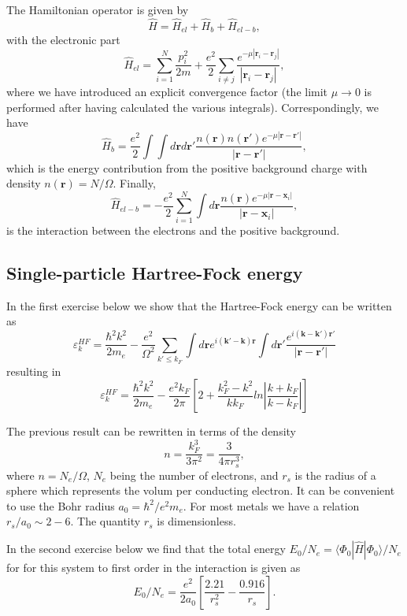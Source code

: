 \documentclass[graybox,sectrefs,envcountresetchap,open=right]{svmonodo}
\begin{document}
The Hamiltonian operator is given by
\[
\hat{H}=\hat{H}_{el}+\hat{H}_{b}+\hat{H}_{el-b},
\]
with the electronic part
\[
\hat{H}_{el}=\sum_{i=1}^N\frac{p_i^2}{2m}+\frac{e^2}{2}\sum_{i\ne j}\frac{e^{-\mu |\mathbf{r}_i-\mathbf{r}_j|}}{|\mathbf{r}_i-\mathbf{r}_j|},
\]
where we have introduced an explicit convergence factor
(the limit $\mu\rightarrow 0$ is performed after having calculated the various integrals).
Correspondingly, we have
\[
\hat{H}_{b}=\frac{e^2}{2}\int\int d\mathbf{r}d\mathbf{r}'\frac{n(\mathbf{r})n(\mathbf{r}')e^{-\mu |\mathbf{r}-\mathbf{r}'|}}{|\mathbf{r}-\mathbf{r}'|},
\]
which is the energy contribution from the positive background charge with density
$n(\mathbf{r})=N/\Omega$. Finally,
\[
\hat{H}_{el-b}=-\frac{e^2}{2}\sum_{i=1}^N\int d\mathbf{r}\frac{n(\mathbf{r})e^{-\mu |\mathbf{r}-\mathbf{x}_i|}}{|\mathbf{r}-\mathbf{x}_i|},
\]
is the interaction between the electrons and the positive background.



\subsection{Single-particle Hartree-Fock energy}

In the first exercise below we show that the Hartree-Fock energy can be written as 
\[
\varepsilon_{k}^{HF}=\frac{\hbar^{2}k^{2}}{2m_e}-\frac{e^{2}}
{\Omega^{2}}\sum_{k'\leq
k_{F}}\int d\mathbf{r}e^{i(\mathbf{k}'-\mathbf{k})\mathbf{r}}\int
d\mathbf{r'}\frac{e^{i(\mathbf{k}-\mathbf{k}')\mathbf{r}'}}
{\vert\mathbf{r}-\mathbf{r}'\vert}
\]
resulting in
\[
\varepsilon_{k}^{HF}=\frac{\hbar^{2}k^{2}}{2m_e}-\frac{e^{2}
k_{F}}{2\pi}
\left[
2+\frac{k_{F}^{2}-k^{2}}{kk_{F}}ln\left\vert\frac{k+k_{F}}
{k-k_{F}}\right\vert
\right]
\]



The previous result can be rewritten in terms of the density
\[
n= \frac{k_F^3}{3\pi^2}=\frac{3}{4\pi r_s^3},
\]
where $n=N_e/\Omega$, $N_e$ being the number of electrons, and $r_s$ is the radius of a sphere which represents the volum per conducting electron.  
It can be convenient to use the Bohr radius $a_0=\hbar^2/e^2m_e$.
For most metals we have a relation $r_s/a_0\sim 2-6$.  The quantity $r_s$ is dimensionless.


In the second exercise below  we find that
the total energy
$E_0/N_e=\langle\Phi_{0}|\hat{H}|\Phi_{0}\rangle/N_e$ for
for this system to first order in the interaction is given as 
\[
E_0/N_e=\frac{e^2}{2a_0}\left[\frac{2.21}{r_s^2}-\frac{0.916}{r_s}\right].
\]
\end{document}
